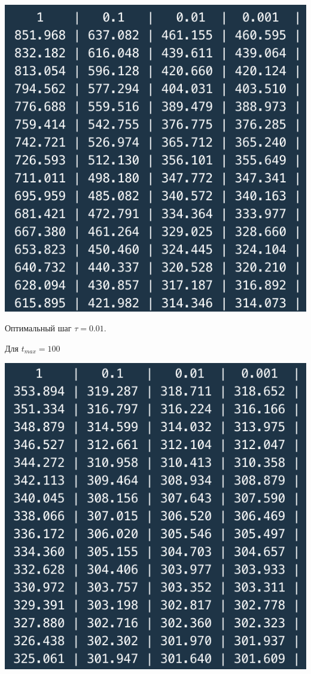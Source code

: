 \documentclass[a4paper,14pt]{extreport} %
\begin{document}
\begin{enumerate}
\includegraphics{2}

Оптимальный шаг $\tau=0.01$. 

Для $t_{max} = 100$

\includegraphics{3}


\end{enumerate}
\end{document}

